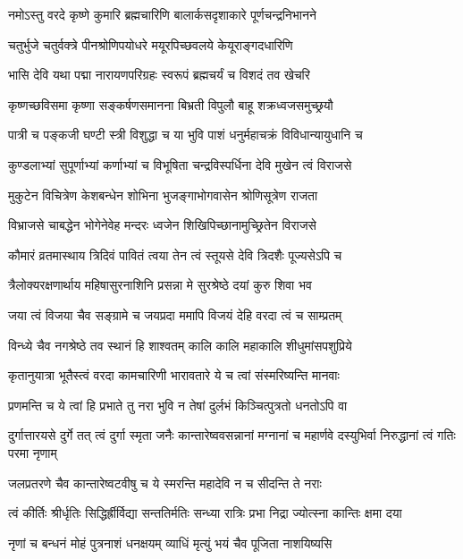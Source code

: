 \twolineshloka
{नमोऽस्तु वरदे कृष्णे कुमारि ब्रह्मचारिणि}
{बालार्कसदृशाकारे पूर्णचन्द्रनिभानने}


\twolineshloka
{चतुर्भुजे चतुर्वक्त्रे पीनश्रोणिपयोधरे}
{मयूरपिच्छवलये केयूराङ्गदधारिणि}


\twolineshloka
{भासि देवि यथा पद्मा नारायणपरिग्रहः}
{स्वरूपं ब्रह्मचर्यं च विशदं तव खेचरि}


\twolineshloka
{कृष्णच्छविसमा कृष्णा सङ्कर्षणसमानना}
{बिभ्रती विपुलौ बाहू शक्रध्वजसमुच्छ्रयौ}


\twolineshloka
{पात्री च पङ्कजी घण्टी स्त्री विशुद्धा च या भुवि}
{पाशं धनुर्महाचक्रं विविधान्यायुधानि च}


\twolineshloka
{कुण्डलाभ्यां सुपूर्णाभ्यां कर्णाभ्यां च विभूषिता}
{चन्द्रविस्पर्धिना देवि मुखेन त्वं विराजसे}


\twolineshloka
{मुकुटेन विचित्रेण केशबन्धेन शोभिना}
{भुजङ्गाभोगवासेन श्रोणिसूत्रेण राजता}


\twolineshloka
{विभ्राजसे चाबद्धेन भोगेनेवेह मन्दरः}
{ध्वजेन शिखिपिच्छानामुच्छ्रितेन विराजसे}


\twolineshloka
{कौमारं व्रतमास्थाय त्रिदिवं पावितं त्वया}
{तेन त्वं स्तूयसे देवि त्रिदशैः पूज्यसेऽपि च}


\twolineshloka
{त्रैलोक्यरक्षणार्थाय महिषासुरनाशिनि}
{प्रसन्ना मे सुरश्रेष्ठे दयां कुरु शिवा भव}


\twolineshloka
{जया त्वं विजया चैव सङ्ग्रामे च जयप्रदा}
{ममापि विजयं देहि वरदा त्वं च साम्प्रतम्}


\twolineshloka
{विन्ध्ये चैव नगश्रेष्ठे तव स्थानं हि शाश्वतम्}
{कालि कालि महाकालि शीधुमांसपशुप्रिये}


\twolineshloka
{कृतानुयात्रा भूतैस्त्वं वरदा कामचारिणी}
{भारावतारे ये च त्वां संस्मरिष्यन्ति मानवाः}


\twolineshloka
{प्रणमन्ति च ये त्वां हि प्रभाते तु नरा भुवि}
{न तेषां दुर्लभं किञ्चित्पुत्रतो धनतोऽपि वा}


\threelineshloka
{दुर्गात्तारयसे दुर्गे तत् त्वं दुर्गा स्मृता जनैः}
{कान्तारेष्ववसन्नानां मग्नानां च महार्णवे}
{दस्युभिर्वा निरुद्धानां त्वं गतिः परमा नृणाम्}


\twolineshloka
{जलप्रतरणे चैव कान्तारेष्वटवीषु च}
{ये स्मरन्ति महादेवि न च सीदन्ति ते नराः}


\twolineshloka
{त्वं कीर्तिः श्रीर्धृतिः सिद्धिर्ह्रीर्विद्या सन्ततिर्मतिः}
{सन्ध्या रात्रिः प्रभा निद्रा ज्योत्स्ना कान्तिः क्षमा दया}


\twolineshloka
{नृणां च बन्धनं मोहं पुत्रनाशं धनक्षयम्}
{व्याधिं मृत्युं भयं चैव पूजिता नाशयिष्यसि}


